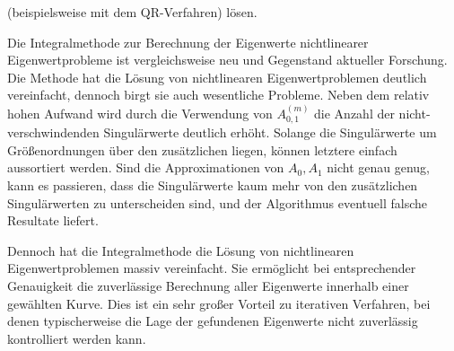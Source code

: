 (beispielsweise mit dem QR-Verfahren) lösen.

Die Integralmethode zur Berechnung der Eigenwerte nichtlinearer Eigenwertprobleme ist vergleichsweise neu und Gegenstand aktueller Forschung.
Die Methode hat die Lösung von nichtlinearen Eigenwertproblemen deutlich vereinfacht, dennoch birgt sie auch wesentliche Probleme.
Neben dem relativ hohen Aufwand wird durch die Verwendung von $A_{0, 1}^{(m)}$ die Anzahl der nicht-verschwindenden Singulärwerte deutlich erhöht.
Solange die  Singulärwerte um Größenordnungen über den zusätzlichen liegen, können letztere einfach aussortiert werden.
Sind die Approximationen von $A_0, A_1$ nicht genau genug, kann es passieren, dass die  Singulärwerte kaum mehr von den zusätzlichen Singulärwerten zu unterscheiden sind, und der Algorithmus eventuell falsche Resultate liefert.

Dennoch hat die Integralmethode die Lösung von nichtlinearen Eigenwertproblemen massiv vereinfacht.
Sie ermöglicht bei entsprechender Genauigkeit die zuverlässige Berechnung aller Eigenwerte innerhalb einer gewählten Kurve.
Dies ist ein sehr großer Vorteil zu iterativen Verfahren, bei denen typischerweise die Lage der gefundenen Eigenwerte nicht zuverlässig kontrolliert werden kann.
